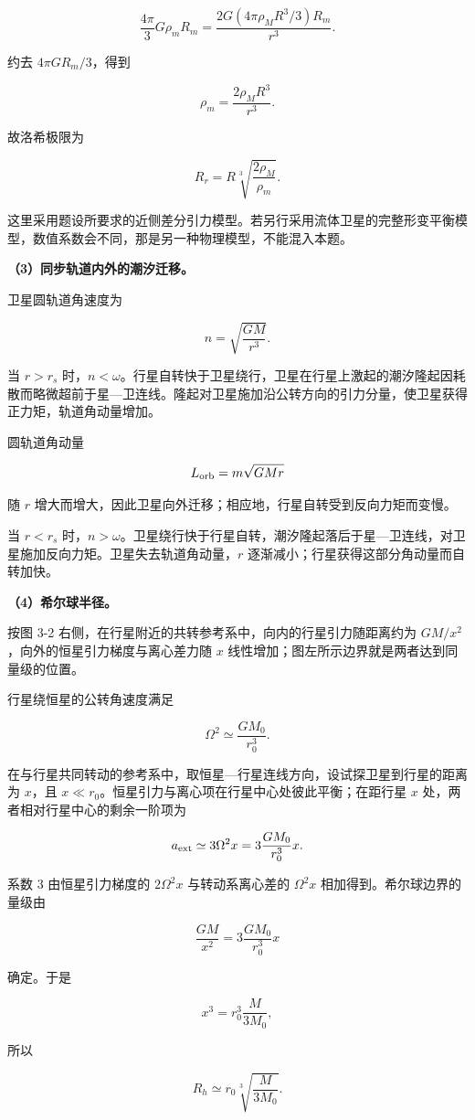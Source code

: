 \documentclass[12pt,a4paper,UTF8]{ctexart}
\begin{document}
\[\frac{4\pi}{3}G\rho_mR_m
=\frac{2G(4\pi\rho_MR^3/3)R_m}{r^3}.\]

约去 \(4\pi GR_m/3\)，得到

\[\rho_m=\frac{2\rho_MR^3}{r^3}.\]

故洛希极限为

\[\boxed{R_r=R\sqrt[3]{\frac{2\rho_M}{\rho_m}}}.\]

这里采用题设所要求的近侧差分引力模型。若另行采用流体卫星的完整形变平衡模型，数值系数会不同，那是另一种物理模型，不能混入本题。

\textbf{（3）同步轨道内外的潮汐迁移。}

卫星圆轨道角速度为

\[n=\sqrt{\frac{GM}{r^3}}.\]

当 \(r>r_s\)
时，\(n<\omega\)。行星自转快于卫星绕行，卫星在行星上激起的潮汐隆起因耗散而略微超前于星---卫连线。隆起对卫星施加沿公转方向的引力分量，使卫星获得正力矩，轨道角动量增加。

圆轨道角动量

\[L_{\rm orb}=m\sqrt{GMr}\]

随 \(r\)
增大而增大，因此卫星向外迁移；相应地，行星自转受到反向力矩而变慢。

当 \(r<r_s\)
时，\(n>\omega\)。卫星绕行快于行星自转，潮汐隆起落后于星---卫连线，对卫星施加反向力矩。卫星失去轨道角动量，\(r\)
逐渐减小；行星获得这部分角动量而自转加快。

\textbf{（4）希尔球半径。}

按图 3-2 右侧，在行星附近的共转参考系中，向内的行星引力随距离约为
\(GM/x^2\)，向外的恒星引力梯度与离心差力随 \(x\)
线性增加；图左所示边界就是两者达到同量级的位置。

行星绕恒星的公转角速度满足

\[\Omega^2\simeq\frac{GM_0}{r_0^3}.\]

在与行星共同转动的参考系中，取恒星---行星连线方向，设试探卫星到行星的距离为
\(x\)，且 \(x\ll r_0\)。恒星引力与离心项在行星中心处彼此平衡；在距行星
\(x\) 处，两者相对行星中心的剩余一阶项为

\[a_{\rm ext}\simeq3\Omega^2x
=3\frac{GM_0}{r_0^3}x.\]

系数 \(3\) 由恒星引力梯度的 \(2\Omega^2x\) 与转动系离心差的
\(\Omega^2x\) 相加得到。希尔球边界的量级由

\[\frac{GM}{x^2}=3\frac{GM_0}{r_0^3}x\]

确定。于是

\[x^3=r_0^3\frac{M}{3M_0},\]

所以

\[\boxed{R_h\simeq r_0\sqrt[3]{\frac{M}{3M_0}}}.\]
\end{document}
